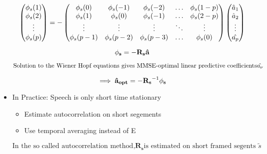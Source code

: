 \begin{itemize}
\begin{equation*}\begin{pmatrix}
\phi_{s}(1) \\ \phi_{s}(2) \\ \vdots \\ \phi_{s}(p)
\end{pmatrix}=-\begin{pmatrix}\phi_{s}(0) & \phi_{s}(-1) & \phi_{s}(-2) & \ldots & \phi_{s}(1 -p) \\
\phi_{s}(1) & \phi_{s}(0) & \phi_{s}(-1) & \ldots & \phi_{s}(2 -p) \\
\vdots & \vdots & \vdots & \ddots & \vdots \\
\phi_{s}(p-1) & \phi_{s}(p-2) & \phi_{s}(p-3) & \ldots & \phi_{s}(0)\\ \end{pmatrix}\begin{pmatrix}\hat{a}_1 \\ \hat{a}_2 \\ \vdots \\ \hat{a_{p}}\end{pmatrix}\end{equation*}

\begin{equation*} \mathbf{\phi_{s}} = -\mathbf{R_s}\mathbf{\hat{a}}\end{equation*}

\begin{equation*} \mbox{Solution to the Wiener Hopf equations gives MMSE-optimal linear predictive coefficients} \hat{a_\nu}\end{equation*}

\begin{equation*} \implies \mathbf{\hat{a}_{opt}}= -\mathbf{R_s}^{-1}\mathbf{\phi_{s}} \end{equation*}

\item In Practice: Speech is only short time stationary
\begin{itemize}
\item Estimate autocorrelation on short segements

\item Use temporal averaging instead of E{}
\end{itemize}

\begin{equation*} \mbox{In the so called autocorrelation method,} \mathbf{R_s} \mbox{is estimated on short framed segents } \widetilde{s} \end{equation*}


\end{itemize}
